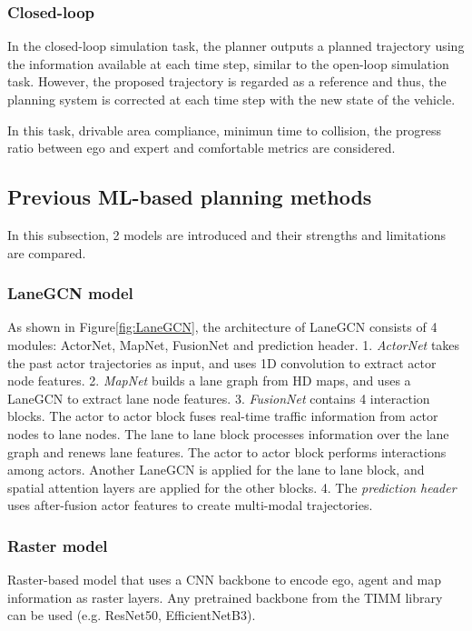 \documentclass[10pt,conference,compsocconf]{IEEEtran}
\begin{document}
\subsubsection{Closed-loop}

In the closed-loop simulation task, the planner outputs a planned trajectory using the information available at each time step, similar to the open-loop simulation task. However, the proposed trajectory is regarded as a reference and thus, the planning system is corrected at each time step with the new state of the vehicle.

In this task, drivable area compliance, minimun time to collision, the progress ratio between ego and expert and comfortable metrics are considered. 

\subsection{Previous ML-based planning methods}

In this subsection, 2 models are introduced and their strengths and limitations are compared.


\subsubsection{LaneGCN model}

As shown in Figure\ref{fig:LaneGCN}, the architecture of LaneGCN consists of 4 modules\cite{LaneGCN}: ActorNet, MapNet, FusionNet and prediction header. 1. \emph{ActorNet} takes the past actor trajectories as input, and uses 1D convolution to extract actor node features. 2. \emph{MapNet} builds a lane graph from HD maps, and uses a LaneGCN to extract lane node features. 3. \emph{FusionNet} contains 4 interaction blocks. The actor to actor block fuses real-time traffic information from actor nodes to lane nodes. The lane to lane block processes information over the lane graph and renews lane features. The actor to actor block performs interactions among actors. Another LaneGCN is applied for the lane to lane block, and spatial attention layers are applied for the other blocks. 4. The \emph{prediction header} uses after-fusion actor features to create multi-modal trajectories.
\subsubsection{Raster model}

Raster-based model that uses a CNN backbone to encode ego, agent and map information as raster layers.\cite{Raster} Any pretrained backbone from the TIMM library can be used (e.g. ResNet50, EfficientNetB3).
\end{document}
